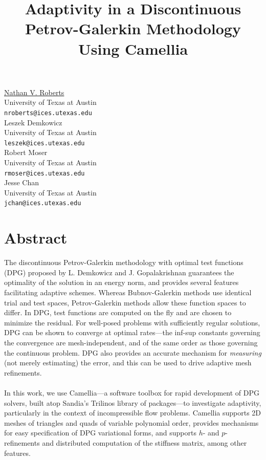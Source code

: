 \documentclass[article,A4,11pt]{llncs}%
\begin{document}
\title{Adaptivity in a Discontinuous Petrov-Galerkin Methodology Using Camellia}
 \author{} \institute{}
\maketitle
\begin{center}
{\large \underline{Nathan V. Roberts}}\\
University of Texas at Austin\\
{\tt nroberts@ices.utexas.edu}
\\ \vspace{4mm}
{\large Leszek Demkowicz}\\
University of Texas at Austin\\
{\tt leszek@ices.utexas.edu}
\\ \vspace{4mm}
{\large Robert Moser}\\
University of Texas at Austin\\
{\tt rmoser@ices.utexas.edu}
\\ \vspace{4mm}
{\large Jesse Chan}\\
University of Texas at Austin\\
{\tt jchan@ices.utexas.edu}
\end{center}

\section*{Abstract}
The discontinuous Petrov-Galerkin methodology with optimal test functions (DPG) proposed by L. Demkowicz and J. Gopalakrishnan guarantees the optimality of the solution in an energy norm, and provides several features facilitating adaptive schemes.  Whereas Bubnov-Galerkin methods use identical trial and test spaces, Petrov-Galerkin methods allow these function spaces to differ. In DPG, test functions are computed on the fly and are chosen to minimize the residual. For well-posed problems with sufficiently regular solutions, DPG can be shown to converge at optimal rates---the inf-sup constants governing the convergence are mesh-independent, and of the same order as those governing the continuous problem. DPG also provides an accurate mechanism for \emph{measuring} (not merely estimating) the error, and this can be used to drive adaptive mesh refinements.\\
\\
In this work, we use Camellia---a software toolbox for rapid development of DPG solvers, built atop Sandia's Trilinos library of packages---to investigate adaptivity, particularly in the context of incompressible flow problems.  Camellia supports 2D meshes of triangles and quads of variable polynomial order, provides mechanisms for easy specification of DPG variational forms, and supports $h$- and $p$- refinements and distributed computation of the stiffness matrix, among other features.
\end{document}
